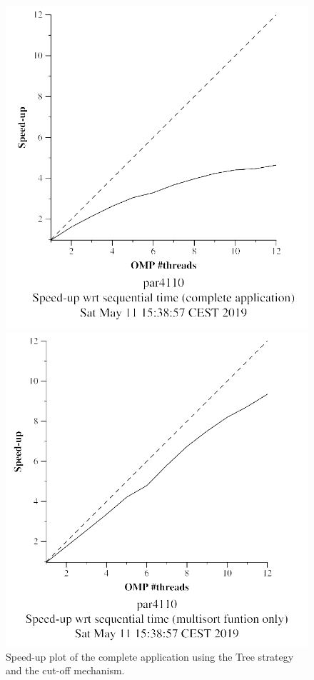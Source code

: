 \documentclass[12pt, a4paper]{article}
\begin{document}
\begin{figure}[H]
\centering
\begin{minipage}[b]{0.4\linewidth}
  \centering
  \includegraphics[scale=0.5]{./images/S3/multisort-omp-strong_boada-2_tree_depend_complete_application}
  \caption{Speed-up plot of the complete application using the Tree strategy and the cut-off mechanism.}
  \label{fig:mandel-omp-10000-strong-21-time}
\end{minipage}%
\hspace{0.5cm}
\begin{minipage}[b]{0.4\linewidth}
  \centering
  \includegraphics[scale=0.5]{./images/S3/multisort-omp-strong_boada-2_tree_depend_multisort_only}

\end{minipage}
\end{figure}
\end{document}
